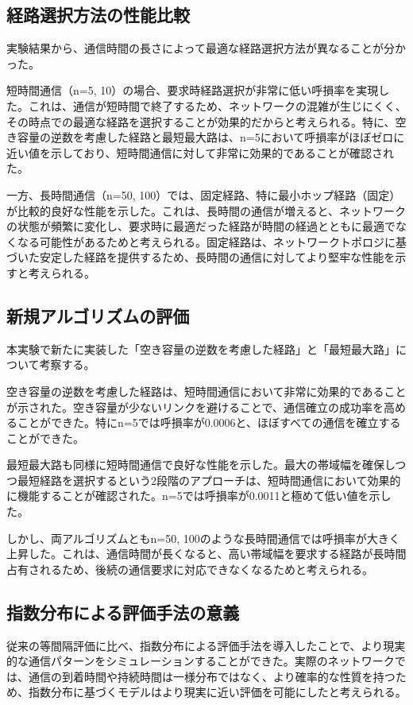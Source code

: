 \documentclass[a4paper,11pt]{jsarticle}
\begin{document}
\subsection{経路選択方法の性能比較}
実験結果から、通信時間の長さによって最適な経路選択方法が異なることが分かった。

短時間通信（n=5, 10）の場合、要求時経路選択が非常に低い呼損率を実現した。これは、通信が短時間で終了するため、ネットワークの混雑が生じにくく、その時点での最適な経路を選択することが効果的だからと考えられる。特に、空き容量の逆数を考慮した経路と最短最大路は、n=5において呼損率がほぼゼロに近い値を示しており、短時間通信に対して非常に効果的であることが確認された。

一方、長時間通信（n=50, 100）では、固定経路、特に最小ホップ経路（固定）が比較的良好な性能を示した。これは、長時間の通信が増えると、ネットワークの状態が頻繁に変化し、要求時に最適だった経路が時間の経過とともに最適でなくなる可能性があるためと考えられる。固定経路は、ネットワークトポロジに基づいた安定した経路を提供するため、長時間の通信に対してより堅牢な性能を示すと考えられる。

\subsection{新規アルゴリズムの評価}
本実験で新たに実装した「空き容量の逆数を考慮した経路」と「最短最大路」について考察する。

空き容量の逆数を考慮した経路は、短時間通信において非常に効果的であることが示された。空き容量が少ないリンクを避けることで、通信確立の成功率を高めることができた。特にn=5では呼損率が0.0006と、ほぼすべての通信を確立することができた。

最短最大路も同様に短時間通信で良好な性能を示した。最大の帯域幅を確保しつつ最短経路を選択するという2段階のアプローチは、短時間通信において効果的に機能することが確認された。n=5では呼損率が0.0011と極めて低い値を示した。

しかし、両アルゴリズムともn=50, 100のような長時間通信では呼損率が大きく上昇した。これは、通信時間が長くなると、高い帯域幅を要求する経路が長時間占有されるため、後続の通信要求に対応できなくなるためと考えられる。

\subsection{指数分布による評価手法の意義}
従来の等間隔評価に比べ、指数分布による評価手法を導入したことで、より現実的な通信パターンをシミュレーションすることができた。実際のネットワークでは、通信の到着時間や持続時間は一様分布ではなく、より確率的な性質を持つため、指数分布に基づくモデルはより現実に近い評価を可能にしたと考えられる。
\end{document}

